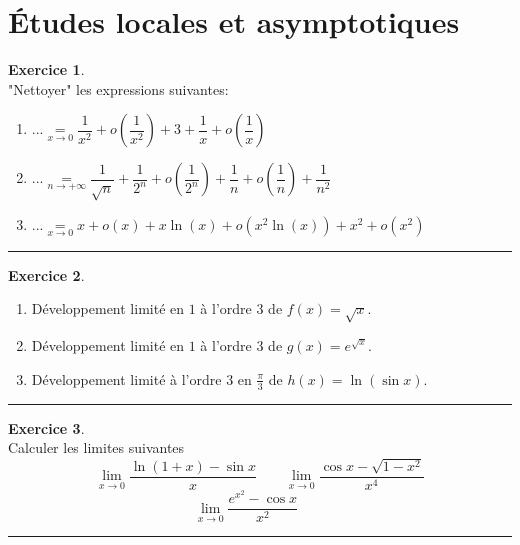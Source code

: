 \documentclass[a4paper,10pt]{article}
\theoremstyle{definition}
\theoremstyle{definition}
\newtheorem{exo}{Exercice}
\begin{document}
\section*{Études locales et asymptotiques}
\begin{minipage}{1\linewidth}
\begin{minipage}[t]{0.48\linewidth}
\raggedright



\begin{exo}\quad\\
"Nettoyer" les expressions suivantes:
\begin{enumerate}
\item $... \underset{x\rightarrow 0}{=} \dfrac{1}{x^2} + o\left(\dfrac{1}{x^2}\right) + 3 + \dfrac{1}{x} + o\left(\dfrac{1}{x}\right) $
\item $... \underset{n\rightarrow +\infty}{=} \dfrac{1}{\sqrt{n}} +\dfrac{1}{2^n}+  o\left(\dfrac{1}{2^n}\right) + \dfrac{1}{n} + o\left(\dfrac{1}{n}\right) + \dfrac{1}{n^2}  $
\item $... \underset{x\rightarrow 0}{=} x + o\left(x\right) + x\ln(x) +  o\left(x^2\ln(x)\right) + x^2 + o(x^2)$
\end{enumerate}
\centering
\rule{1\linewidth}{0.6pt}
\end{exo}

\begin{exo}\quad\\

\begin{enumerate}
\item Développement limité en $1$ à l'ordre $3$ de $f(x)=\sqrt{x}$.

\item Développement limité en $1$ à l'ordre $3$ de $g(x)= e^{\sqrt{x}}$.

\item Développement limité à l'ordre $3$ en $\frac\pi 3$ de $h(x)=\ln (\sin x)$.
\end{enumerate}
\centering
\rule{1\linewidth}{0.6pt}
\end{exo}


\end{minipage}	
\hfill\vrule\hfill
\begin{minipage}[t]{0.48\linewidth}
\raggedright


\begin{exo}\quad\\
Calculer les limites suivantes
$$\lim_{x\rightarrow 0}\frac{\ln (1+x)-\sin x}{x}
\quad\quad \lim_{x\rightarrow 0}\frac{\cos x-\sqrt{1-x^2}}{x^4}$$
$$\lim_{x\rightarrow 0}\frac{e^{x^2}-\cos x}{x^2}
\quad\quad$$ 
\centering\rule{1\linewidth}{0.6pt}
\end{exo}


\end{minipage}
\end{minipage}
\end{document}
